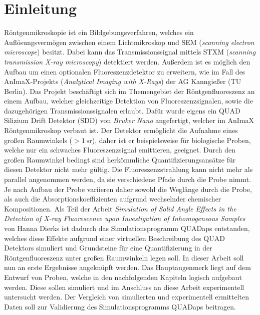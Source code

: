 \section*{Einleitung}
Röntgenmikroskopie ist ein Bildgebungsverfahren, welches ein Auflösungsvermögen zwischen einem Lichtmikroskop und SEM (\textit{scanning electron microscope}) besitzt. Dabei kann das Transmissionssignal mittels STXM (\textit{scanning transmission X-ray microscopy}) detektiert werden. Außerdem ist es möglich den Aufbau um einen optionalen Fluoreszenzdetektor zu erweitern, wie im Fall des AnImaX-Projekts (\textit{Analytical Imaging with X-Rays}) der AG Kanngießer (TU Berlin). Das Projekt beschäftigt sich im Themengebiet der Röntgenfluoreszenz an einem Aufbau, welcher gleichzeitige Detektion von Fluoreszenzsignalen, sowie die dazugehörigen Transmissionssignalen erlaubt. Dafür wurde eigens ein QUAD Silizium Drift Detektor (SDD) von \textit{Bruker Nano} angefertigt, welcher im AnImaX Röntgenmikroskop verbaut ist. Der Detektor ermöglicht die Aufnahme eines großen Raumwinkels ($>\SI{1}{\steradian}$), daher ist er beispielsweise für biologische Proben, welche nur ein schwaches Fluoreszenzsignal emittieren, geeignet. \newline
Durch den großen Raumwinkel bedingt sind herkömmliche Quantifizierungsansätze für diesen Detektor nicht mehr gültig. Die Fluoreszenzstrahlung kann nicht mehr als parallel angenommen werden, da sie verschiedene Pfade durch die Probe nimmt. Je nach Aufbau der Probe variieren daher sowohl die Weglänge durch die Probe, als auch die Absorptionskoeffizienten aufgrund wechselnder chemischer Kompositionen. \newline
Als Teil der Arbeit \textit{Simulation of Solid Angle Effects in the Detection of X-ray Fluorescence upon Investigation of Inhomogeneous Samples} von Hanna Dierks ist dadurch das Simulationsprogramm QUADaps entstanden, welches diese Effekte aufgrund einer virtuellen Beschreibung des QUAD Detektors simuliert und Grundsteine für eine Quantifizierung in der Röntgenfluoreszenz unter großen Raumwinkeln legen soll. \newline
In dieser Arbeit soll nun an erste Ergebnisse angeknüpft werden. Das Hauptaugenmerk liegt auf dem Entwurf von Proben, welche in den nachfolgenden Kapiteln logisch aufgebaut werden. Diese sollen simuliert und im Anschluss an diese Arbeit experimentell untersucht werden. Der Vergleich von simulierten und experimentell ermittelten Daten soll zur Validierung des Simulationsprogramms QUADaps beitragen.

